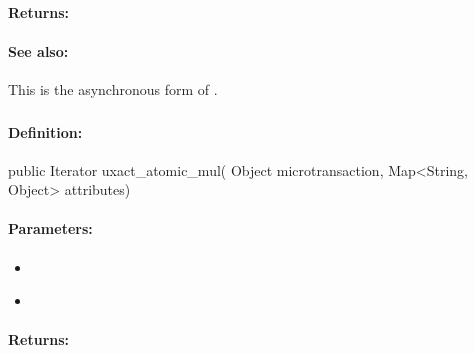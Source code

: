 \paragraph{Returns:}


\paragraph{See also:}  This is the asynchronous form of .

\pagebreak
\subsubsection{}
\label{api:java:uxact_atomic_mul}


\paragraph{Definition:}
\begin{javacode}
public Iterator uxact_atomic_mul(
        Object microtransaction,
        Map<String, Object> attributes)
\end{javacode}

\paragraph{Parameters:}
\begin{itemize}[noitemsep]
\item {}\\

\item {}\\

\end{itemize}

\paragraph{Returns:}


\pagebreak
\subsubsection{}
\label{api:java:cond_atomic_mul}


